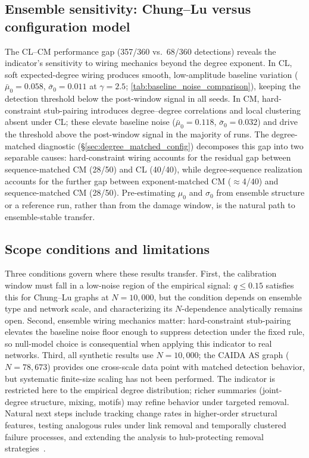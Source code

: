 \documentclass{nws}
\begin{document}
\subsection*{Ensemble sensitivity: Chung--Lu versus configuration model}
The CL--CM performance gap (357/360 vs.\ 68/360 detections) reveals the indicator's
sensitivity to wiring mechanics beyond the degree exponent. In CL, soft expected-degree
wiring produces smooth, low-amplitude baseline variation
($\bar{\mu}_0=0.058$, $\bar{\sigma}_0=0.011$ at $\gamma=2.5$;
\autoref{tab:baseline_noise_comparison}), keeping the detection threshold below the
post-window signal in all seeds. In CM, hard-constraint stub-pairing introduces
degree--degree correlations and local clustering absent under CL; these elevate baseline
noise ($\bar{\mu}_0=0.118$, $\bar{\sigma}_0=0.032$) and drive the threshold above the
post-window signal in the majority of runs. The degree-matched diagnostic
(\S\ref{sec:degree_matched_config}) decomposes this gap into two separable causes:
hard-constraint wiring accounts for the residual gap between sequence-matched CM (28/50)
and CL (40/40), while degree-sequence realization accounts for the further gap between
exponent-matched CM ($\approx$4/40) and sequence-matched CM (28/50). Pre-estimating
$\mu_0$ and $\sigma_0$ from ensemble structure or a reference run, rather than from the
damage window, is the natural path to ensemble-stable transfer.

\subsection*{Scope conditions and limitations}
Three conditions govern where these results transfer. First, the calibration window must
fall in a low-noise region of the empirical signal: $q\le0.15$ satisfies this for
Chung--Lu graphs at $N=10{,}000$, but the condition depends on ensemble type and network
scale, and characterizing its $N$-dependence analytically remains open. Second, ensemble
wiring mechanics matter: hard-constraint stub-pairing elevates the baseline noise floor
enough to suppress detection under the fixed rule, so null-model choice is consequential
when applying this indicator to real networks. Third, all synthetic results use
$N=10{,}000$; the CAIDA AS graph ($N=78{,}673$) provides one cross-scale data point with
matched detection behavior, but systematic finite-size scaling has not been performed. The
indicator is restricted here to the empirical degree distribution; richer summaries
(joint-degree structure, mixing, motifs) may refine behavior under targeted removal.
Natural next steps include tracking change rates in higher-order structural features,
testing analogous rules under link removal and temporally clustered failure processes, and
extending the analysis to hub-protecting removal strategies~\citep{lee2022degree}.
\end{document}
